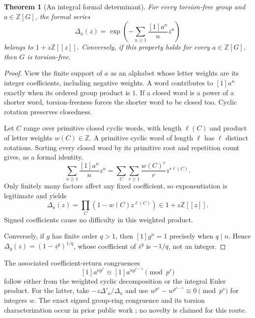 \documentclass[11pt,a4paper,oneside]{report}
\newtheorem{theorem}{Theorem}[section]
\theoremstyle{definition}
\theoremstyle{remark}
\newcommand{\Z}{\mathbb Z}
\newcommand{\ct}{[1]}
\begin{document}
\begin{theorem}[An integral formal determinant]\label{M03:thm:witt}
For every torsion-free group and \(a\in\Z[G]\), the formal series
\begin{equation}\label{M03:eq:witt}
\Delta_a(z)=\exp\left(-\sum_{n\ge1}\frac{\ct a^n}{n}z^n\right)
\end{equation}
belongs to \(1+z\Z[[z]]\). Conversely, if this property holds for every \(a\in\Z[G]\), then \(G\) is torsion-free.
\end{theorem}
\begin{proof}
View the finite support of \(a\) as an alphabet whose letter weights are its integer coefficients, including negative weights. A word contributes to \(\ct a^n\) exactly when its ordered group product is \(1\). If a closed word is a power of a shorter word, torsion-freeness forces the shorter word to be closed too. Cyclic rotation preserves closedness.

Let \(C\) range over primitive closed cyclic words, with length \(\ell(C)\) and product of letter weights \(w(C)\in\Z\). A primitive cyclic word of length \(\ell\) has \(\ell\) distinct rotations. Sorting every closed word by its primitive root and repetition count gives, as a formal identity,
\[
\sum_{n\ge1}\frac{\ct a^n}{n}z^n
=\sum_C\sum_{r\ge1}\frac{w(C)^r}{r}z^{r\ell(C)}.
\]
Only finitely many factors affect any fixed coefficient, so exponentiation is legitimate and yields
\begin{equation}\label{M03:eq:necklace}
\Delta_a(z)=\prod_C(1-w(C)z^{\ell(C)})\in1+z\Z[[z]].
\end{equation}
Signed coefficients cause no difficulty in this weighted product.

Conversely, if \(g\) has finite order \(q>1\), then
\(\ct g^n=1\) precisely when \(q\mid n\). Hence
\(\Delta_g(z)=(1-z^q)^{1/q}\), whose coefficient of \(z^q\) is \(-1/q\), not an integer.
\end{proof}
The associated coefficient-return congruences
\begin{equation}\label{M03:eq:gauss}
\ct a^{np^r}\equiv\ct a^{np^{r-1}}\pmod{p^r}
\end{equation}
follow either from the weighted cyclic decomposition or the integral Euler product. For the latter, take \(-z\Delta'_a/\Delta_a\) and use
\(w^{p^s}-w^{p^{s-1}}\equiv0\pmod{p^s}\) for integers \(w\). The exact signed group-ring congruence and its torsion characterization occur in prior public work \cite{B:GaussNote}; no novelty is claimed for this route.
\end{document}
